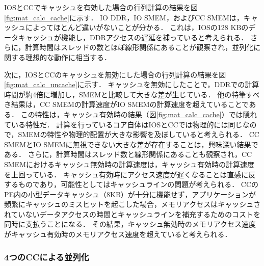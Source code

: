 \documentclass[submit,techrep]{ipsj_v2/UTF8/ipsj}
\begin{document}
IOSとCCでキャッシュを有効した場合の行列計算の結果を図\ref{fig:mat_calc_cache}に示す．
IO DDR，IO SMEM，およびCC SMEMは，キャッシュによってほとんど違いがないことが分かる．
これは，IOSの128 KBのデータキャッシュが機能し，DDRアクセスの遅延を補っていると考えられる．
さらに，計算時間はスレッドの数とほぼ線形関係にあることが観察され，並列化に関する理想的な動作に相当する．

次に，IOSとCCのキャッシュを無効にした場合の行列計算の結果を図\ref{fig:mat_calc_uncache}に示す．
キャッシュを無効にしたことで，DDRでの計算時間が約4倍に増加し，SMEMと比較して大きな差が生じている．
他の特筆すべき結果は，CC SMEMの計算速度がIO SMEMの計算速度を超えていることである．
この特性は，キャッシュ有効時の結果（図\ref{fig:mat_calc_cache}）では隠れている特性だ．
計算を行っているコア自体はIOSとCCでは物理的には同じなので，SMEMの特性や物理的配置が大きな影響を及ぼしていると考えられる．
CC SMEMとIO SMEMに無視できない大きな差が存在することは，興味深い結果である．
さらに，計算時間はスレッド数と線形関係にあることも観察され，CC SMEMにおけるキャッシュ無効時の計算速度は，キャッシュ有効時の計算速度を上回っている．
キャッシュ有効時にアクセス速度が遅くなることは直感に反するものであり，可能性としてはキャッシュラインの問題が考えられる．
CCのPE内の小型データキャッシュ（8KB）が十分に機能せず，アプリケーションが頻繁にキャッシュのミスヒットを起こした場合，メモリアクセスはキャッシュされていないデータアクセスの時間とキャッシュラインを補充するためのコストを同時に支払うことになる．
その結果，キャッシュ無効時のメモリアクセス速度がキャッシュ有効時のメモリアクセス速度を超えていると考えられる．

\subsubsection{4つのCCによる並列化}
\label{sec:four_CCs}
\end{document}
